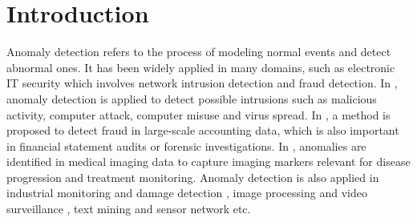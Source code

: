 \documentclass[a4paper,conference]{IEEEtran}
\begin{document}
\section{Introduction}
 Anomaly detection refers to the process of modeling normal events and detect  abnormal ones. It has been widely applied in many domains, such as  electronic IT security  which involves network intrusion detection and fraud detection. In \cite{jyothsna2011review}\cite{yang2006support}, anomaly detection is applied to detect possible intrusions such as  malicious activity, computer attack, computer misuse and virus spread.
In \cite{schreyer2017detection}, a method is proposed to  detect fraud in large-scale accounting data, which is also important in financial statement audits or forensic investigations. In \cite{schlegl2017unsupervised}, anomalies are identified in medical imaging data to capture imaging markers relevant for disease progression and treatment monitoring. Anomaly detection is also applied in industrial monitoring and damage detection \cite{clifton2006learning}, image processing and video surveillance \cite{pokrajac2007incremental}, text mining \cite{ando2007clustering} and  sensor network \cite{chatzigiannakis2006hierarchical} etc.
\end{document}
